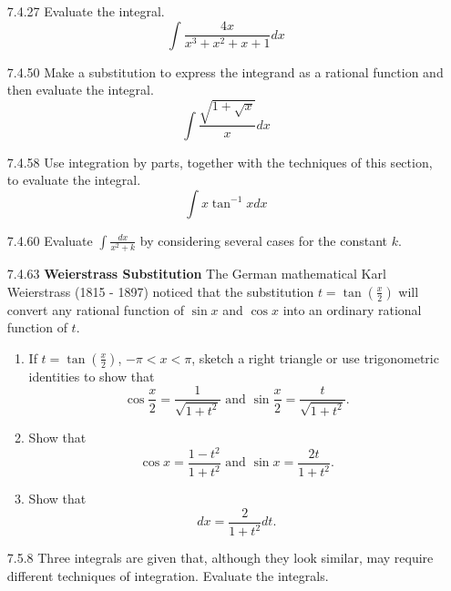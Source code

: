 \documentclass{article}
\begin{document}
\begin{enumerate}
\item[7.4.27]
    Evaluate the integral.
    \[
        \int \frac{4x}{x^{3} + x^{2} + x + 1}dx
    \]


\vspace{6cm}

\item[7.4.50]
    Make a substitution to express the integrand as a rational function and then
    evaluate the integral.
    \[
        \int \frac{\sqrt{1 + \sqrt{x}}}{x} dx
    \]

\vspace{6cm}

\item[7.4.58]
    Use integration by parts, together with the techniques of this section,
    to evaluate the integral.
    \[
        \int x \tan^{-1} x dx
    \]

\newpage

\item[7.4.60]
    Evaluate $\displaystyle \int \frac{dx}{x^{2} + k}$ by considering several
    cases for the constant $k$.

\vspace{8cm}

\item[7.4.63]
    \textbf{Weierstrass Substitution} The German mathematical Karl Weierstrass
    (1815 - 1897) noticed that the substitution $t=\tan (\frac{x}{2})$
    will convert any rational function of $\sin x$ and $\cos x$ into an
    ordinary rational function of $t$.

    \begin{enumerate}
        \item If $t=\tan (\frac{x}{2})$, $-\pi < x < \pi$, sketch a right
            triangle or use trigonometric identities to show that
            \[
                \cos \frac{x}{2} = \frac{1}{\sqrt{1+t^{2}}}
                \text{ and }
                \sin \frac{x}{2} = \frac{t}{\sqrt{1+t^{2}}}.
            \]
        \item Show that
            \[
                \cos x = \frac{1-t^{2}}{1+t^{2}}
                \text{ and }
                \sin x = \frac{2t}{1+t^{2}}.
            \]
        \item Show that
            \[
                dx = \frac{2}{1+t^{2}}dt.
            \]
    \end{enumerate}

\newpage

\item[7.5.8]
    Three integrals are given that, although they look similar, may
    require different techniques of integration. Evaluate the integrals.


\end{enumerate}
\end{document}
